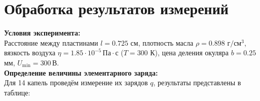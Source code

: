 \documentclass{lab}
\begin{document}
\section{Обработка результатов измерений}
\noindent
\textbf{Условия эксперимента:}
\\
Расстояние между пластинами $l = 0.725$ см, плотность масла $\rho = 0.898 \,\, \text{г}/\text{см}^3$, вязкость воздуха $\eta = 1.85 \cdot 10^{-5} \, \text{Па} \cdot \text{с}$ ($T = 300$ К), цена деления окуляра $b = 0.25$ мм, $U_\text{min} = 300 \, \text{В}$.
\\
\textbf{Определение величины элементарного заряда:}
\\
Для 14 капель проведём измерение их зарядов $q$, результаты представлены в таблице:
\end{document}
